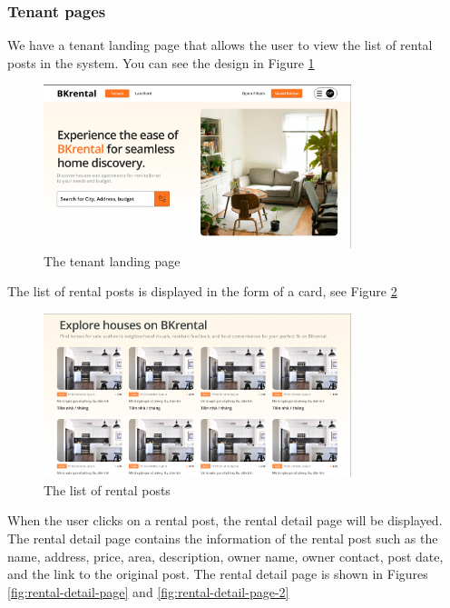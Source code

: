 \subsubsection{Tenant pages}
We have a tenant landing page that allows the user to view the list of rental posts in the system. You can see the design in Figure \ref{fig:tenant-landing-page}

\clearpage
\begin{figure}[ht]
    \centering
    \includegraphics[width=0.8\textwidth]{Images/Mockup/landing_page.png}
    \caption{The tenant landing page}
    \label{fig:tenant-landing-page}
\end{figure}

The list of rental posts is displayed in the form of a card, see Figure \ref{fig:rental-posts}

\begin{figure}[ht]
    \centering
    \includegraphics[width=0.8\textwidth]{Images/Mockup/rental_posts.png}
    \caption{The list of rental posts}
    \label{fig:rental-posts} 
\end{figure}

When the user clicks on a rental post, the rental detail page will be displayed. The rental detail page contains the information of the rental post such as the name, address, price, area, description, owner name, owner contact, post date, and the link to the original post. The rental detail page is shown in Figures \ref{fig:rental-detail-page} and \ref{fig:rental-detail-page-2}

